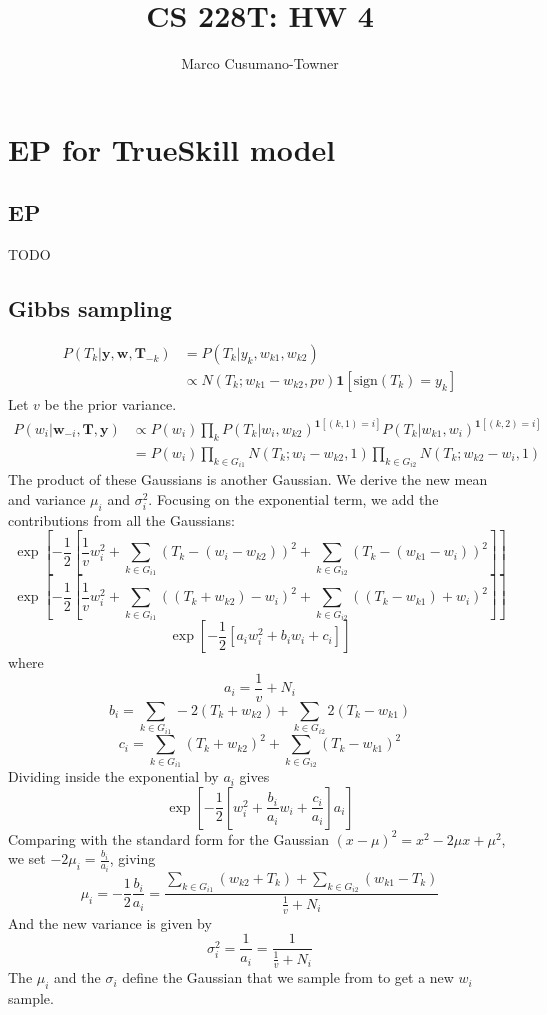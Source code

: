 \documentclass[11pt]{article}
\title{CS 228T: HW 4}
\author{Marco Cusumano-Towner}
\newcommand{\mb}[1]{\mathbf{#1}}
\newcommand{\id}[1]{\mathbf{1}\left[#1\right]}
\begin{document}
\maketitle


\section{EP for TrueSkill model}
\subsection{EP}
TODO
\subsection{Gibbs sampling}
\begin{align*}
  P(T_k | \mb{y}, \mb{w}, \mb{T}_{-k}) &= P(T_k | y_k, w_{k1},w_{k2})\\
  &\propto N(T_k;w_{k1}-w_{k2},pv)\id{\mbox{sign}(T_k) = y_k }
\end{align*}
Let $v$ be the prior variance.
\begin{align*}
  P(w_i | \mb{w}_{-i}, \mb{T}, \mb{y}) &\propto P(w_i) \prod_k P(T_k | w_i, w_{k2})^{\id{(k,1) = i}} P(T_k | w_{k1}, w_i)^{\id{(k,2) = i}}\\
  &= P(w_i) \prod_{k \in G_{i1} } N(T_k ; w_i - w_{k2}, 1) \prod_{k \in G_{i2}} N(T_k; w_{k2} - w_i, 1)
\end{align*}
The product of these Gaussians is another Gaussian. We derive the new mean and variance $\mu_i$ and $\sigma^2_i$. Focusing on the exponential term, we add the contributions from all the Gaussians:
\[ \exp \left[ -\frac{1}{2} \left[ \frac{1}{v} w_i^2 + \sum_{k \in G_{i1}} (T_k - (w_i - w_{k2}))^2 + \sum_{k \in G_{i2}} (T_k - (w_{k1} - w_i))^2\right] \right] \]
\[ \exp \left[ -\frac{1}{2} \left[ \frac{1}{v} w_i^2 + \sum_{k \in G_{i1}} ((T_k + w_{k2}) - w_i)^2 + \sum_{k \in G_{i2}} ((T_k - w_{k1}) + w_i)^2\right] \right] \]
\[ \exp \left[ -\frac{1}{2} \left[ a_i w_i^2  + b_i w_i +c_i \right] \right] \]
where 
\[ a_i = \frac{1}{v} + N_i\]
\[ b_i =  \sum_{k \in G_{i1}} -2 (T_k + w_{k2}) + \sum_{k \in G_{i2}} 2 (T_k - w_{k1}) \]
\[ c_i =  \sum_{k \in G_{i1}} (T_k + w_{k2})^2 + \sum_{k \in G_{i2}} (T_k - w_{k1})^2\]
Dividing inside the exponential by $a_i$ gives 
\[ \exp \left[ -\frac{1}{2} \left[ w_i^2  + \frac{b_i}{a_i} w_i +\frac{c_i}{a_i} \right] a_i\right]\]
Comparing with the standard form for the Gaussian $(x - \mu)^2 = x^2 - 2 \mu x + \mu^2$, we set $-2\mu_i = \frac{b_i}{a_i}$, giving 
\[ \mu_i = -\frac{1}{2}\frac{b_i}{a_i} = \frac{\sum_{k \in G_{i1}} ( w_{k2} + T_k) + \sum_{k \in G_{i2}} (w_{k1} - T_k) }{\frac{1}{v} + N_i}\]
And the new variance is given by
\[ \sigma_i^2 = \frac{1}{a_i} = \frac{1}{\frac{1}{v} + N_i} \]
The $\mu_i$ and the $\sigma_i$  define the Gaussian that we sample from to get a new $w_i$ sample.
\end{document}
